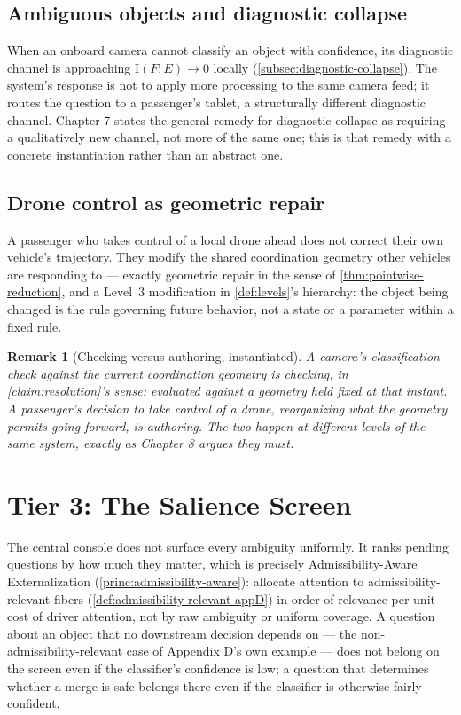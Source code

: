 \documentclass[12pt]{report}
\newtheorem{remark}[definition]{Remark}
\newcommand{\I}{\ensuremath{\mathrm{I}}}
\begin{document}
\subsection*{Ambiguous objects and diagnostic collapse}

When an onboard camera cannot classify an object with confidence, its
diagnostic channel is approaching $\I(F;E) \to 0$ locally
(\cref{subsec:diagnostic-collapse}). The system's response is not to
apply more processing to the same camera feed; it routes the question to
a passenger's tablet, a structurally different diagnostic channel.
Chapter 7 states the general remedy for diagnostic collapse as
requiring a qualitatively new channel, not more of the same one; this is
that remedy with a concrete instantiation rather than an abstract one.

\subsection*{Drone control as geometric repair}

A passenger who takes control of a local drone ahead does not correct
their own vehicle's trajectory. They modify the shared coordination
geometry other vehicles are responding to --- exactly geometric repair
in the sense of \cref{thm:pointwise-reduction}, and a Level~3
modification in \cref{def:levels}'s hierarchy: the object being changed
is the rule governing future behavior, not a state or a parameter within
a fixed rule.

\begin{remark}[Checking versus authoring, instantiated]
A camera's classification check against the current coordination
geometry is checking, in \cref{claim:resolution}'s sense: evaluated
against a geometry held fixed at that instant. A passenger's decision to
take control of a drone, reorganizing what the geometry permits going
forward, is authoring. The two happen at different levels of the same
system, exactly as Chapter 8 argues they must.
\end{remark}

\section*{Tier 3: The Salience Screen}

The central console does not surface every ambiguity uniformly. It
ranks pending questions by how much they matter, which is precisely
Admissibility-Aware Externalization (\cref{princ:admissibility-aware}):
allocate attention to admissibility-relevant fibers
(\cref{def:admissibility-relevant-appD}) in order of relevance per unit
cost of driver attention, not by raw ambiguity or uniform coverage. A
question about an object that no downstream decision depends on --- the
non-admissibility-relevant case of Appendix D's own example --- does not
belong on the screen even if the classifier's confidence is low; a
question that determines whether a merge is safe belongs there even if
the classifier is otherwise fairly confident.
\end{document}
